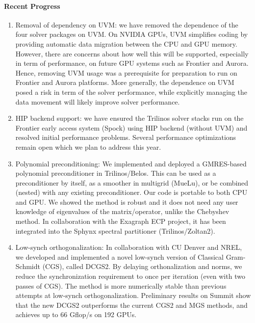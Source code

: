 \paragraph{Recent Progress}
\begin{enumerate}
\item Removal of dependency on UVM:
we have removed the dependence of the four solver packages on UVM.
On NVIDIA GPUs, UVM simplifies coding by providing automatic data migration between the CPU and GPU memory. However, there are concerns about how well this will be supported, especially in term of performance, on future GPU systems such as Frontier and Aurora. Hence, removing UVM usage was a prerequisite for preparation to run on Frontier and Aurora platforms. 
More generally, the dependence on UVM posed a risk in term of the solver performance, while explicitly managing the data movement will likely improve solver performance. 

\item HIP backend support:
we have ensured the Trilinos solver stacks run on the Frontier early access system (Spock) using HIP backend (without UVM) and resolved initial performance problems. Several performance optimizations remain open which we plan to address this year.

\item Polynomial preconditioning: We implemented and deployed a GMRES-based polynomial preconditioner in Trilinos/Belos. This can be used as a preconditioner by itself, as a smoother in multigrid (MueLu), or be combined (nested) with any existing preconditioner. Our code is portable to both CPU and GPU. We showed the method is robust and it does not need any user knowledge of eigenvalues of the matrix/operator, unlike the Chebyshev method. In collaboration with the Exagraph ECP project, it has been integrated into the Sphynx spectral partitioner (Trilinos/Zoltan2).
\item Low-synch orthogonalization: In collaboration with CU Denver and NREL, we developed and implemented a novel low-synch version of Classical Gram-Schmidt (CGS), called DCGS2. By delaying orthonalization and norms, we reduce the synchronization requirement to once per iteration (even with two passes of CGS). The method is more numerically stable than previous attempts at low-synch orthogonalization. Preliminary results on Summit show that the new DCGS2 outperforms the current CGS2 and MGS methods, and achieves up to 66 Gflop/s on 192 GPUs.
\end{enumerate}

